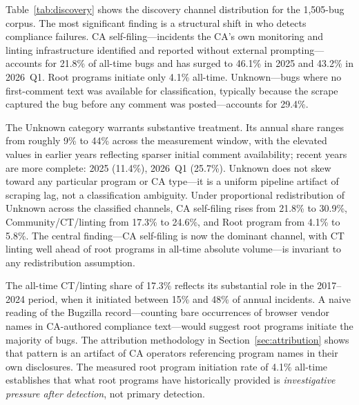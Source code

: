 \documentclass[10pt,twocolumn,letterpaper]{article}
\begin{document}
Table~\ref{tab:discovery} shows the discovery channel distribution
for the 1,505-bug corpus. The most significant finding is a structural
shift in who detects compliance failures. CA self-filing---incidents
the CA's own monitoring and linting infrastructure identified and
reported without external prompting---accounts for 21.8\% of all-time
bugs and has surged to 46.1\% in 2025 and 43.2\% in 2026~Q1. Root
programs initiate only 4.1\% all-time. Unknown---bugs where no
first-comment text was available for classification, typically because
the scrape captured the bug before any comment was posted---accounts
for 29.4\%.

The Unknown category warrants substantive treatment. Its annual share
ranges from roughly 9\% to 44\% across the measurement window, with
the elevated values in earlier years reflecting sparser initial
comment availability; recent years are more complete: 2025 (11.4\%),
2026~Q1 (25.7\%). Unknown does not skew toward any particular program
or CA type---it is a uniform pipeline artifact of scraping lag, not a
classification ambiguity. Under proportional redistribution of Unknown
across the classified channels, CA self-filing rises from 21.8\% to
30.9\%, Community/CT/linting from 17.3\% to 24.6\%, and Root program
from 4.1\% to 5.8\%. The central finding---CA self-filing is now the
dominant channel, with CT linting well ahead of root programs in
all-time absolute volume---is invariant to any redistribution
assumption.

The all-time CT/linting share of 17.3\% reflects its substantial role
in the 2017--2024 period, when it initiated between 15\% and 48\% of
annual incidents. A naive reading of the Bugzilla record---counting
bare occurrences of browser vendor names in CA-authored compliance
text---would suggest root programs initiate the majority of bugs. The
attribution methodology in Section~\ref{sec:attribution} shows that
pattern is an artifact of CA operators referencing program names in
their own disclosures. The measured root program initiation rate of
4.1\% all-time establishes that what root programs have historically
provided is \textit{investigative pressure after detection}, not
primary detection.
\end{document}
